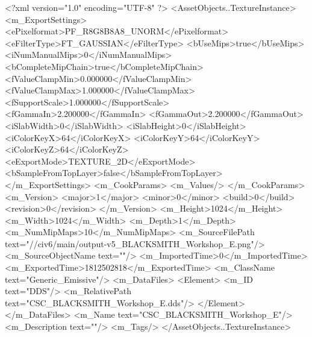 <?xml version="1.0" encoding="UTF-8" ?>
<AssetObjects..TextureInstance>
	<m_ExportSettings>
		<ePixelformat>PF_R8G8B8A8_UNORM</ePixelformat>
		<eFilterType>FT_GAUSSIAN</eFilterType>
		<bUseMips>true</bUseMips>
		<iNumManualMips>0</iNumManualMips>
		<bCompleteMipChain>true</bCompleteMipChain>
		<fValueClampMin>0.000000</fValueClampMin>
		<fValueClampMax>1.000000</fValueClampMax>
		<fSupportScale>1.000000</fSupportScale>
		<fGammaIn>2.200000</fGammaIn>
		<fGammaOut>2.200000</fGammaOut>
		<iSlabWidth>0</iSlabWidth>
		<iSlabHeight>0</iSlabHeight>
		<iColorKeyX>64</iColorKeyX>
		<iColorKeyY>64</iColorKeyY>
		<iColorKeyZ>64</iColorKeyZ>
		<eExportMode>TEXTURE_2D</eExportMode>
		<bSampleFromTopLayer>false</bSampleFromTopLayer>
	</m_ExportSettings>
	<m_CookParams>
		<m_Values/>
	</m_CookParams>
	<m_Version>
		<major>1</major>
		<minor>0</minor>
		<build>0</build>
		<revision>0</revision>
	</m_Version>
	<m_Height>1024</m_Height>
	<m_Width>1024</m_Width>
	<m_Depth>1</m_Depth>
	<m_NumMipMaps>10</m_NumMipMaps>
	<m_SourceFilePath text="//civ6/main/output\blacksmith-v5\Textures\CSC_BLACKSMITH_Workshop_E.png"/>
	<m_SourceObjectName text=""/>
	<m_ImportedTime>0</m_ImportedTime>
	<m_ExportedTime>1812502818</m_ExportedTime>
	<m_ClassName text="Generic_Emissive"/>
	<m_DataFiles>
		<Element>
			<m_ID text="DDS"/>
			<m_RelativePath text="CSC_BLACKSMITH_Workshop_E.dds"/>
		</Element>
	</m_DataFiles>
	<m_Name text="CSC_BLACKSMITH_Workshop_E"/>
	<m_Description text=""/>
	<m_Tags/>
</AssetObjects..TextureInstance>

